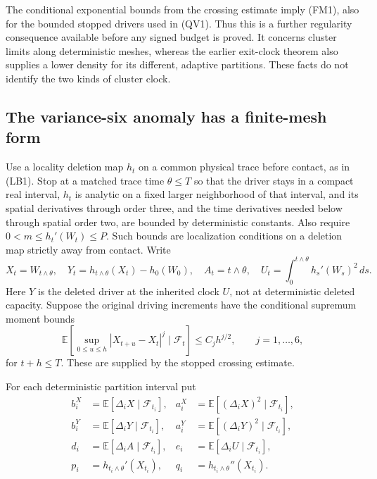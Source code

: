 \documentclass[11pt]{article}
\theoremstyle{definition}\newtheorem{definition}[theorem]{Definition}
\theoremstyle{remark}\newtheorem{remark}[theorem]{Remark}
\begin{document}
The conditional exponential bounds from the crossing estimate imply
(FM1), also for the bounded stopped drivers used in (QV1). Thus this
is a further regularity consequence available before any signed
budget is proved. It concerns cluster limits along deterministic
meshes, whereas the earlier exit-clock theorem also supplies a lower
density for its different, adaptive partitions. These facts do not
identify the two kinds of cluster clock.

\subsection{The variance-six anomaly has a finite-mesh form}

Use a locality deletion map $h_t$ on a common physical trace before
contact, as in (LB1). Stop at a matched trace time $\theta\le T$ so
that the driver stays in a compact real interval, $h_t$ is analytic
on a fixed larger neighborhood of that interval, and its spatial
derivatives through order three, and the time derivatives needed
below through spatial order two, are bounded by deterministic
constants. Also require $0<m\le h_t'(W_t)\le P$. Such bounds are
localization conditions on a deletion map strictly away from contact.
Write
\[
 X_t=W_{t\wedge\theta},\quad
 Y_t=h_{t\wedge\theta}(X_t)-h_0(W_0),\quad
 A_t=t\wedge\theta,\quad
 U_t=\int_0^{t\wedge\theta}h_s'(W_s)^2\,ds.
 \tag{FM3}
\]
Here $Y$ is the deleted driver at the inherited clock $U$, not at
deterministic deleted capacity. Suppose the original driving
increments have the conditional supremum moment bounds
\[
 \mathbb E[\sup_{0\le u\le h}|X_{t+u}-X_t|^j
                         \mid\mathcal F_t]\le C_jh^{j/2},
 \qquad j=1,\ldots,6,
 \tag{FM4}
\]
for $t+h\le T$. These are supplied by the stopped crossing estimate.

For each deterministic partition interval put
\[
 \begin{aligned}
 b_i^X&=\mathbb E[\Delta_iX\mid\mathcal F_{t_i}],&
 a_i^X&=\mathbb E[(\Delta_iX)^2\mid\mathcal F_{t_i}],\\
 b_i^Y&=\mathbb E[\Delta_iY\mid\mathcal F_{t_i}],&
 a_i^Y&=\mathbb E[(\Delta_iY)^2\mid\mathcal F_{t_i}],\\
 d_i&=\mathbb E[\Delta_iA\mid\mathcal F_{t_i}],&
 e_i&=\mathbb E[\Delta_iU\mid\mathcal F_{t_i}],\\
 p_i&=h_{t_i\wedge\theta}'(X_{t_i}),&
 q_i&=h_{t_i\wedge\theta}''(X_{t_i}).
 \end{aligned}
 \tag{FM5}
\]
\end{document}
